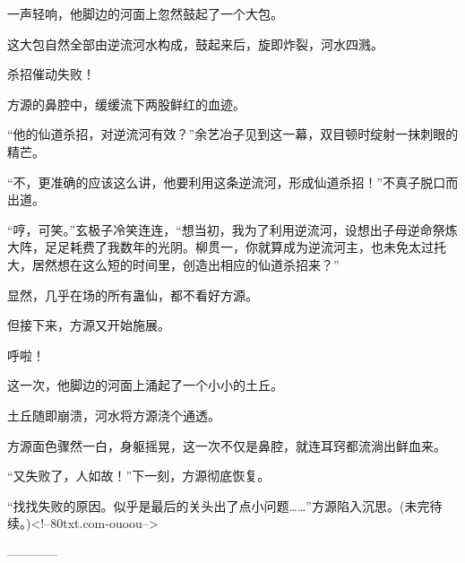 \begin{this_body}
一声轻响，他脚边的河面上忽然鼓起了一个大包。

这大包自然全部由逆流河水构成，鼓起来后，旋即炸裂，河水四溅。

杀招催动失败！

方源的鼻腔中，缓缓流下两股鲜红的血迹。

“他的仙道杀招，对逆流河有效？”余艺冶子见到这一幕，双目顿时绽射一抹刺眼的精芒。

“不，更准确的应该这么讲，他要利用这条逆流河，形成仙道杀招！”不真子脱口而出道。

“哼，可笑。”玄极子冷笑连连，“想当初，我为了利用逆流河，设想出子母逆命祭炼大阵，足足耗费了我数年的光阴。柳贯一，你就算成为逆流河主，也未免太过托大，居然想在这么短的时间里，创造出相应的仙道杀招来？”

显然，几乎在场的所有蛊仙，都不看好方源。

但接下来，方源又开始施展。

呼啦！

这一次，他脚边的河面上涌起了一个小小的土丘。

土丘随即崩溃，河水将方源浇个通透。

方源面色骤然一白，身躯摇晃，这一次不仅是鼻腔，就连耳窍都流淌出鲜血来。

“又失败了，人如故！”下一刻，方源彻底恢复。

“找找失败的原因。似乎是最后的关头出了点小问题……”方源陷入沉思。(未完待续。)<!--80txt.com-ouoou-->

------------

\end{this_body}

